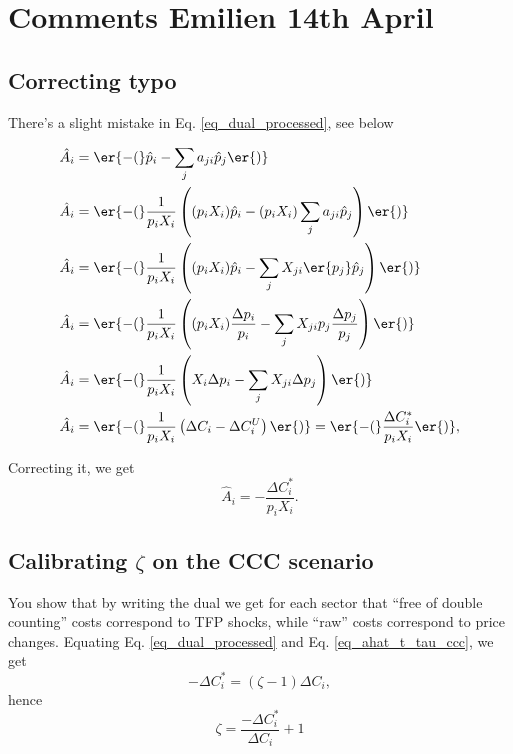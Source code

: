 \documentclass[11pt]{article}
\begin{document}
\section{Comments Emilien 14th April}
\subsection{Correcting typo}

There's a slight mistake in Eq. \ref{eq_dual_processed}, see below

\begin{align}
\hat{A}_i &= \er{-(}\hat{p}_i - \sum_j a_{ji} \hat{p}_{j}\er{)} \\
\hat{A}_i &= \er{-(}\frac{1}{p_i X_i} \left( (p_i X_i) \hat{p}_i - (p_i X_i) \sum_j a_{ji} \hat{p}_{j} \right)\er{)}\\
\hat{A}_i &= \er{-(}\frac{1}{p_i X_i} \left( (p_i X_i)\hat{p}_i - \sum_j X_{ji}\er{p_{j}} \hat{p}_{j}\right)\er{)}\\
\hat{A}_i &= \er{-(}\frac{1}{p_i X_i} \left( (p_i X_i)\frac{\Delta p_i}{p_i} - \sum_j X_{ji}p_{j} \frac{\Delta p_j}{p_j} \right)\er{)}\\
\hat{A}_i &= \er{-(}\frac{1}{p_i X_i} \left( X_i\Delta p_i - \sum_j X_{ji} \Delta p_j \right)\er{)}\\
\hat{A}_i &= \er{-(}\frac{1}{p_i X_i} \left( \Delta C_i  - \Delta C_i^{U} \right)\er{)} = \er{-(}\frac{\Delta C^*_i}{p_i X_i}\er{)},
\end{align}

Correcting it, we get
\begin{equation}
    \hat{A}_i  = -\frac{\Delta C^*_i}{p_i X_i}.
\end{equation}



\subsection{Calibrating $\zeta$ on the CCC scenario}

You show that by writing the dual we get for each sector that ``free of double counting'' costs correspond to TFP shocks, while ``raw'' costs correspond to price changes. Equating Eq. \eqref{eq_dual_processed} and Eq. \eqref{eq_ahat_t_tau_ccc}, we get
\begin{equation*}
    -\Delta C^*_i=(\zeta-1)\Delta C_i,
\end{equation*} 
hence 
\begin{equation}
\label{eq_zeta_ccc}
     \zeta=\frac{-\Delta C^*_i}{\Delta C_i}+1
\end{equation}
\end{document}
